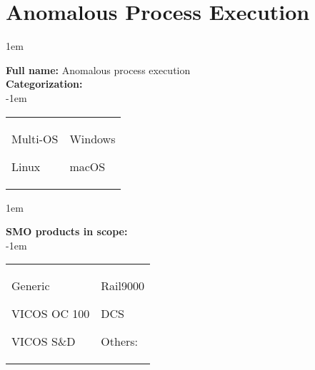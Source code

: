 
%
%

\section{Anomalous Process Execution}
\label{15061}

\openup 1em

\textbf{Full name:} Anomalous process execution\hrulefill \\
{\bf Categorization:} \\

\openup -1em
\vspace{-3em}

\begin{tabular}{p{}p{}}

\begin{todolist}
  	\item Multi-OS
	\item Linux
\end{todolist}
&
\begin{todolist}
	\item[\done] Windows
	\item macOS
\end{todolist}

\end{tabular}

\openup 1em

{\bf SMO products in scope:} \\

\openup -1em
\vspace{-3em}

\begin{tabular}{p{}p{}}

\begin{todolist}
  \item[\done] Generic
  \item[\done] VICOS OC 100
  \item[\done] VICOS S\&D
\end{todolist}
&
\begin{todolist}
  \item Rail9000
  \item DCS
  \item Others: \hrulefill
\end{todolist}

\end{tabular}

